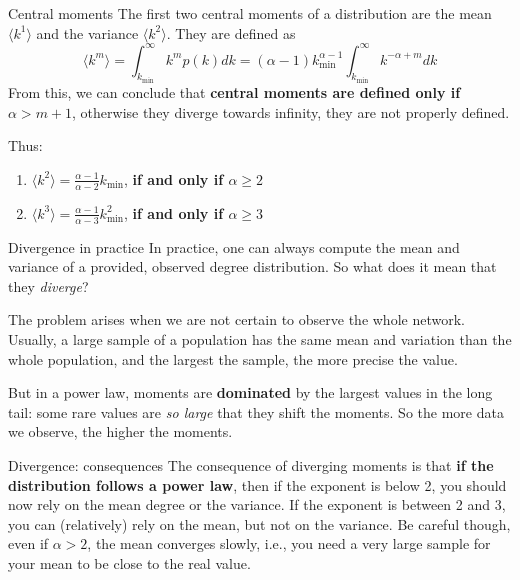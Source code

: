 \documentclass[a4paper,11pt]{book}
\begin{document}
\begin{textbox}{Central moments}
The first two central moments of a distribution are the mean $\langle k^1 \rangle $ and the variance $\langle k^2 \rangle $. They are defined as 
\[
\langle k^m \rangle = \int_{k_{\min}}^{\infty}k^mp(k)dk=(\alpha-1)k^{\alpha-1}_{\min}\int_{k_{\min}}^{\infty}k^{-\alpha+m}dk
\]
From this, we can conclude that \textbf{central moments are defined only if $\alpha>m+1$}, otherwise they diverge towards infinity, they are not properly defined.

Thus:
\begin{enumerate}
    \item $\langle k^2 \rangle = \frac{\alpha-1}{\alpha-2}k_{\min}$, \textbf{if and only if $\alpha\geq 2$}
    \item $\langle k^3 \rangle = \frac{\alpha-1}{\alpha-3}k^2_{\min}$, \textbf{if and only if $\alpha\geq 3$}
\end{enumerate}



\end{textbox}



\begin{textbox}{Divergence in practice}
In practice, one can always compute the mean and variance of a provided, observed degree distribution. So what does it mean that they \textit{diverge}?

The problem arises when we are not certain to observe the whole network. Usually, a large sample of a population has the same mean and variation than the whole population, and the largest the sample, the more precise the value.

But in a power law, moments are \textbf{dominated} by the largest values in the long tail: some rare values are \textit{so large} that they shift the moments. So the more data we observe, the higher the moments.
\end{textbox}

\begin{textbox}{Divergence: consequences}
The consequence of diverging moments is that \textbf{if the distribution follows a power law}, then if the exponent is below 2, you should now rely on the mean degree or the variance. If the exponent is between 2 and 3, you can (relatively) rely on the mean, but not on the variance. Be careful though, even if $\alpha>2$, the mean converges slowly, i.e., you need a very large sample for your mean to be close to the real value.
\end{textbox}
\end{document}
